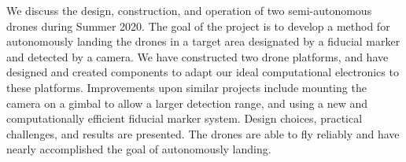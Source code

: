 We discuss the design, construction, and operation of two semi-autonomous drones during Summer 2020. The goal of the project is to develop a method for autonomously landing the drones in a target area designated by a fiducial marker and detected by a camera. We have constructed two drone platforms, and have designed and created components to adapt our ideal computational electronics to these platforms. Improvements upon similar projects include mounting the camera on a gimbal to allow a larger detection range, and using a new and computationally efficient fiducial marker system. Design choices, practical challenges, and results are presented. The drones are able to fly reliably and have nearly accomplished the goal of autonomously landing.